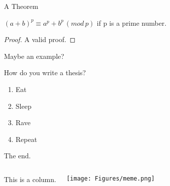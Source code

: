 \documentclass[handout, 10pt]{beamer}
\begin{document}
	\begin{frame}{A Theorem}
		\begin{theorem} 
			$(a+b)^p \equiv a^p + b^p \, (mod \,p)$ if p is a prime number.
		\end{theorem} \pause
		\begin{proof}
			A valid proof.
		\end{proof}
		\begin{example}
			Maybe an example?
		\end{example}
	\end{frame}
	
	
	
		
	
	
	
	\begin{frame}{How do you write a thesis?}
		
		\begin{enumerate}
			\item Eat
			\item Sleep
			\item Rave
			\item Repeat
		\end{enumerate}
	\end{frame}
	
	
	
	\begin{frame}{The end.}
		\begin{columns}
			This is a column.
			
			\texttt{[image: Figures/meme.png]}    
		\end{columns}    
		
		
	\end{frame}
	
%		
%		
	
	
\end{document}
